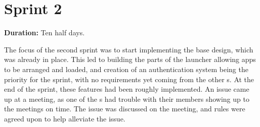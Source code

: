 \section*{Sprint 2}%

\textbf{Duration:} Ten half days. 

The focus of the second sprint was to start implementing the base design, which was already in place.
This led to building the parts of the launcher allowing apps to be arranged and loaded, and creation of an authentication system being the priority for the sprint, with no requirements yet coming from the other \localgroup[]s. 
At the end of the sprint, these features had been roughly implemented. \newline
An issue came up at a meeting, as one of the \localgroup{}s had trouble with their members showing up to the meetings on time. 
The issue was discussed on the meeting, and rules were agreed upon to help alleviate the issue.